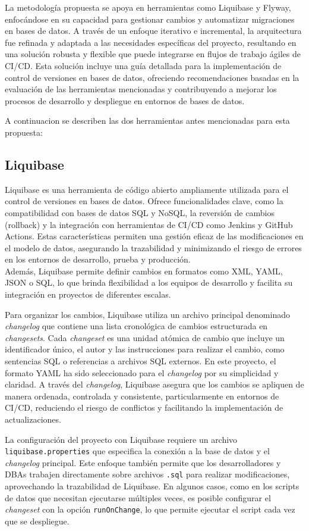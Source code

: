 \documentclass{IEEEtran}
\begin{document}
La metodología propuesta se apoya en herramientas como Liquibase y Flyway, enfocándose en su capacidad para gestionar cambios y automatizar migraciones en bases de datos. A través de un enfoque iterativo e incremental, la arquitectura fue refinada y adaptada a las necesidades específicas del proyecto, resultando en una solución robusta y flexible que puede integrarse en flujos de trabajo ágiles de CI/CD. Esta solución incluye una guía detallada para la implementación de control de versiones en bases de datos, ofreciendo recomendaciones basadas en la evaluación de las herramientas mencionadas y contribuyendo a mejorar los procesos de desarrollo y despliegue en entornos de bases de datos.

A continuacion se describen las dos herramientas antes mencionadas para esta propuesta:
\subsection{Liquibase}
Liquibase es una herramienta de código abierto ampliamente utilizada para el control de versiones en bases de datos. Ofrece funcionalidades clave, como la compatibilidad con bases de datos SQL y NoSQL, la reversión de cambios (rollback) y la integración con herramientas de CI/CD como Jenkins y GitHub Actions. Estas características permiten una gestión eficaz de las modificaciones en el modelo de datos, asegurando la trazabilidad y minimizando el riesgo de errores en los entornos de desarrollo, prueba y producción.\\ Además, Liquibase permite definir cambios en formatos como XML, YAML, JSON o SQL, lo que brinda flexibilidad a los equipos de desarrollo y facilita su integración en proyectos de diferentes escalas.

Para organizar los cambios, Liquibase utiliza un archivo principal denominado \textit{changelog} que contiene una lista cronológica de cambios estructurada en \textit{changesets}. Cada \textit{changeset} es una unidad atómica de cambio que incluye un identificador único, el autor y las instrucciones para realizar el cambio, como sentencias SQL o referencias a archivos SQL externos. En este proyecto, el formato YAML ha sido seleccionado para el \textit{changelog} por su simplicidad y claridad. A través del \textit{changelog}, Liquibase asegura que los cambios se apliquen de manera ordenada, controlada y consistente, particularmente en entornos de CI/CD, reduciendo el riesgo de conflictos y facilitando la implementación de actualizaciones.

La configuración del proyecto con Liquibase requiere un archivo \texttt{liquibase.properties} que especifica la conexión a la base de datos y el \textit{changelog} principal. Este enfoque también permite que los desarrolladores y DBAs trabajen directamente sobre archivos \texttt{.sql} para realizar modificaciones, aprovechando la trazabilidad de Liquibase. En algunos casos, como en los scripts de datos que necesitan ejecutarse múltiples veces, es posible configurar el \textit{changeset} con la opción \texttt{runOnChange}, lo que permite ejecutar el script cada vez que se despliegue.
\end{document}
